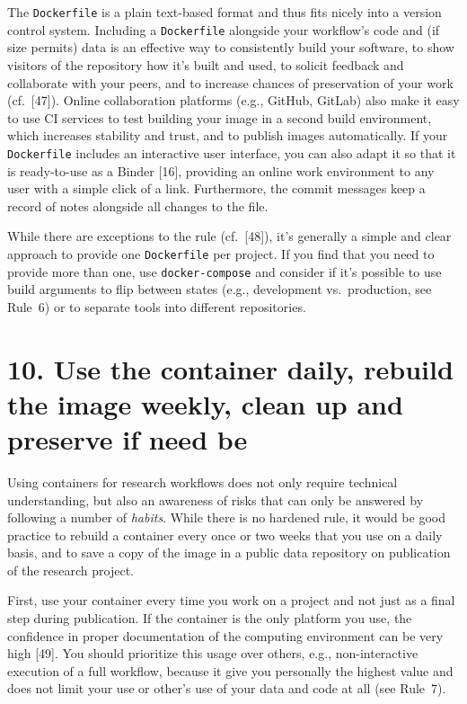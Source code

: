 \documentclass[10pt,letterpaper]{article}
\begin{document}
The \texttt{Dockerfile} is a plain text-based format and thus fits
nicely into a version control system. Including a \texttt{Dockerfile}
alongside your workflow's code and (if size permits) data is an
effective way to consistently build your software, to show visitors of
the repository how it's built and used, to solicit feedback and
collaborate with your peers, and to increase chances of preservation of
your work (cf.~{[}47{]}). Online collaboration platforms (e.g., GitHub,
GitLab) also make it easy to use CI services to test building your image
in a second build environment, which increases stability and trust, and
to publish images automatically. If your \texttt{Dockerfile} includes an
interactive user interface, you can also adapt it so that it is
ready-to-use as a Binder {[}16{]}, providing an online work environment
to any user with a simple click of a link. Furthermore, the commit
messages keep a record of notes alongside all changes to the file.

While there are exceptions to the rule (cf.~{[}48{]}), it's generally a
simple and clear approach to provide one \texttt{Dockerfile} per
project. If you find that you need to provide more than one, use
\texttt{docker-compose} and consider if it's possible to use build
arguments to flip between states (e.g., development vs.~production, see
Rule~6) or to separate tools into different repositories.

\hypertarget{use-the-container-daily-rebuild-the-image-weekly-clean-up-and-preserve-if-need-be}{%
\section*{10. Use the container daily, rebuild the image weekly, clean
up and preserve if need
be}\label{use-the-container-daily-rebuild-the-image-weekly-clean-up-and-preserve-if-need-be}}

Using containers for research workflows does not only require technical
understanding, but also an awareness of risks that can only be answered
by following a number of \emph{habits}. While there is no hardened rule,
it would be good practice to rebuild a container every once or two weeks
that you use on a daily basis, and to save a copy of the image in a
public data repository on publication of the research project.

First, use your container every time you work on a project and not just
as a final step during publication. If the container is the only
platform you use, the confidence in proper documentation of the
computing environment can be very high {[}49{]}. You should prioritize
this usage over others, e.g., non-interactive execution of a full
workflow, because it give you personally the highest value and does not
limit your use or other's use of your data and code at all (see Rule~7).
\end{document}
